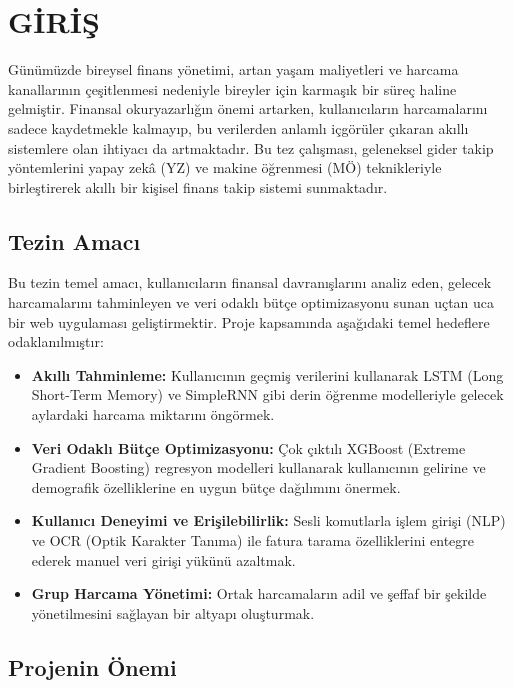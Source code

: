 \chapter{GİRİŞ}\label{giris}

Günümüzde bireysel finans yönetimi, artan yaşam maliyetleri ve harcama kanallarının çeşitlenmesi nedeniyle bireyler için karmaşık bir süreç haline gelmiştir. Finansal okuryazarlığın önemi artarken, kullanıcıların harcamalarını sadece kaydetmekle kalmayıp, bu verilerden anlamlı içgörüler çıkaran akıllı sistemlere olan ihtiyacı da artmaktadır. Bu tez çalışması, geleneksel gider takip yöntemlerini yapay zekâ (YZ) ve makine öğrenmesi (MÖ) teknikleriyle birleştirerek akıllı bir kişisel finans takip sistemi sunmaktadır.

\section{Tezin Amacı}\label{tezinamaci}

Bu tezin temel amacı, kullanıcıların finansal davranışlarını analiz eden, gelecek harcamalarını tahminleyen ve veri odaklı bütçe optimizasyonu sunan uçtan uca bir web uygulaması geliştirmektir. Proje kapsamında aşağıdaki temel hedeflere odaklanılmıştır:

\begin{itemize}
    \item \textbf{Akıllı Tahminleme:} Kullanıcının geçmiş verilerini kullanarak LSTM (Long Short-Term Memory) ve SimpleRNN gibi derin öğrenme modelleriyle gelecek aylardaki harcama miktarını öngörmek.
    \item \textbf{Veri Odaklı Bütçe Optimizasyonu:} Çok çıktılı XGBoost (Extreme Gradient Boosting) regresyon modelleri kullanarak kullanıcının gelirine ve demografik özelliklerine en uygun bütçe dağılımını önermek.
    \item \textbf{Kullanıcı Deneyimi ve Erişilebilirlik:} Sesli komutlarla işlem girişi (NLP) ve OCR (Optik Karakter Tanıma) ile fatura tarama özelliklerini entegre ederek manuel veri girişi yükünü azaltmak.
    \item \textbf{Grup Harcama Yönetimi:} Ortak harcamaların adil ve şeffaf bir şekilde yönetilmesini sağlayan bir altyapı oluşturmak.
\end{itemize}

\section{Projenin Önemi}\label{projeninonemi}

